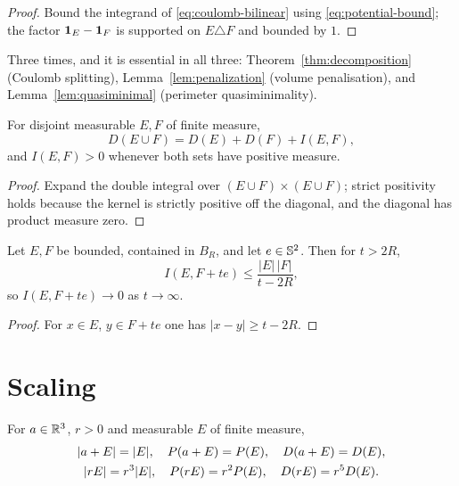 \begin{proof}
Bound the integrand of \eqref{eq:coulomb-bilinear} using
\eqref{eq:potential-bound}; the factor $\mathbf 1_{E}-\mathbf 1_{F}$ is supported on
$E\triangle F$ and bounded by $1$.
\end{proof}

\begin{fnote}\label{fnote:lipschitz-uses}
Three times, and it is essential in all three:
Theorem~\ref{thm:decomposition} (Coulomb splitting), Lemma~\ref{lem:penalization}
(volume penalisation), and Lemma~\ref{lem:quasiminimal} (perimeter
quasiminimality).
\end{fnote}

\begin{lemma}\label{lem:coulomb-disjoint}
For disjoint measurable $E,F$ of finite measure,
\begin{equation}\label{eq:coulomb-disjoint}
  D(E\cup F)=D(E)+D(F)+I(E,F),
\end{equation}
and $I(E,F)>0$ whenever both sets have positive measure.
\end{lemma}

\begin{proof}
Expand the double integral over $(E\cup F)\times(E\cup F)$; strict positivity
holds because the kernel is strictly positive off the diagonal, and the
diagonal has product measure zero.
\end{proof}

\begin{lemma}\label{lem:cross-decay}
Let $E,F$ be bounded, contained in $B_{R}$, and let $e\in\mathbb S^2$.  Then for
$t>2R$,
\begin{equation}\label{eq:cross-decay}
  I(E,F+te)\le\frac{|E|\,|F|}{t-2R},
\end{equation}
so $I(E,F+te)\to0$ as $t\to\infty$.
\end{lemma}

\begin{proof}
For $x\in E$, $y\in F+te$ one has $|x-y|\ge t-2R$.
\end{proof}

\section{Scaling}

\begin{lemma}\label{lem:coulomb-scaling}
For $a\in\mathbb R^3$, $r>0$ and measurable $E$ of finite measure,
\begin{equation}\label{eq:scaling}
\begin{gathered}
  |a+E|=|E|,\quad P(a+E)=P(E),\quad D(a+E)=D(E),\\
  |rE|=r^3|E|,\quad P(rE)=r^2P(E),\quad D(rE)=r^5D(E).
\end{gathered}
\end{equation}
\end{lemma}

